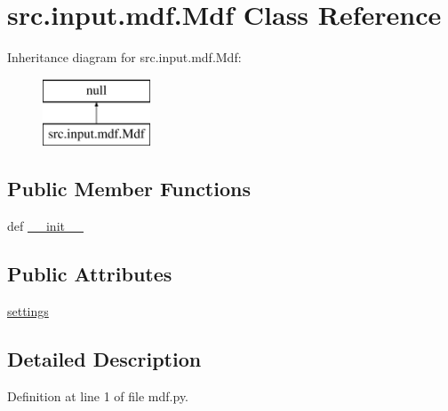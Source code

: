 \hypertarget{classsrc_1_1input_1_1mdf_1_1_mdf}{\section{src.\+input.\+mdf.\+Mdf Class Reference}
\label{classsrc_1_1input_1_1mdf_1_1_mdf}
}
Inheritance diagram for src.\+input.\+mdf.\+Mdf\+:\begin{figure}[H]
\begin{center}
\leavevmode
\includegraphics[height=2.000000cm]{classsrc_1_1input_1_1mdf_1_1_mdf}
\end{center}
\end{figure}
\subsection*{Public Member Functions}
\begin{DoxyCompactItemize}
\item 
def \hyperlink{classsrc_1_1input_1_1mdf_1_1_mdf_a42d4fa18793a16655495093b6a7a3472}{\+\_\+\+\_\+init\+\_\+\+\_\+}
\end{DoxyCompactItemize}
\subsection*{Public Attributes}
\begin{DoxyCompactItemize}
\item 
\hyperlink{classsrc_1_1input_1_1mdf_1_1_mdf_a90316935eb6c7438caf6ea511dfb9e2d}{settings}
\end{DoxyCompactItemize}


\subsection{Detailed Description}


Definition at line 1 of file mdf.\+py.



